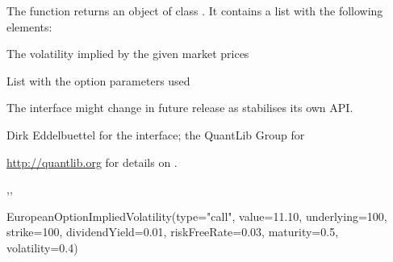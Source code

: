 \begin{Value}
The  function returns an object
of class . It contains a list with the
following elements:
\begin{ldescription}
\item[\code{impliedVol}] The volatility implied by the given market prices
\item[\code{parameters}] List with the option parameters used
\end{ldescription}
\end{Value}
\begin{Note}\relax
The interface might change in future release as 
stabilises its own API.
\end{Note}
\begin{Author}\relax
Dirk Eddelbuettel  for the \R{} interface;
the QuantLib Group for 
\end{Author}
\begin{References}\relax
\url{http://quantlib.org} for details on .
\end{References}
\begin{SeeAlso}\relax
{},,
\end{SeeAlso}
\begin{Examples}
\begin{ExampleCode}
EuropeanOptionImpliedVolatility(type="call", value=11.10, underlying=100,
        strike=100, dividendYield=0.01, riskFreeRate=0.03,
        maturity=0.5, volatility=0.4)
\end{ExampleCode}
\end{Examples}

